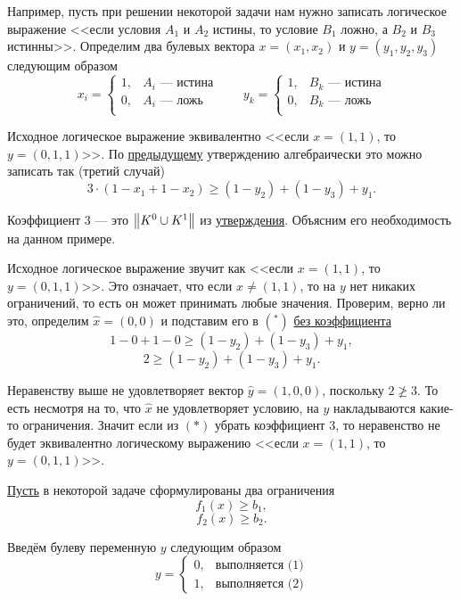 Например, пусть при решении некоторой задачи нам нужно записать логическое выражение <<если условия $A_1$ и $A_2$ истины, то условие $B_1$ ложно, а $B_2$ и $B_3$ истинны>>. Определим два булевых вектора $x = (x_1, x_2)$ и $y = (y_1, y_2, y_3)$ следующим образом
\[
x_i = \begin{cases}
	1,& \text{$A_i$ --- истина}\\
	0,& \text{$A_i$ --- ложь}\\
\end{cases} \qquad y_k = \begin{cases}
1,& \text{$B_k$ --- истина}\\
0,& \text{$B_k$ --- ложь}\\
\end{cases}
\]

Исходное логическое выражение эквивалентно <<если $x = (1, 1)$, то $y = (0, 1, 1)$>>. По \hyperref[fact:complex_conditions]{предыдущему} утверждению алгебраически это можно записать так (третий случай)
\[
\boxed{3 \cdot (1 - x_1 + 1 - x_2) \ge (1 - y_2) + (1 - y_3) + y_1}\tag{*}.
\]

Коэффициент $3$ --- это $\norm{K^0 \cup K^1}$ из \hyperref[fact:complex_conditions]{утверждения}. Объясним его необходимость на данном примере.

Исходное логическое выражение звучит как <<если $x = (1, 1)$, то $y = (0, 1, 1)$>>. Это означает, что если $x \neq (1, 1)$, то на $y$ нет никаких ограничений, то есть он может принимать любые значения. Проверим, верно ли это, определим $\hat{x} = (0, 0)$ и подставим его в $(^*)$ \underline{без коэффициента}
\[
1 - 0 + 1 - 0 \ge (1 - y_2) + (1 - y_3) + y_1,
\]
\[
2 \ge (1 - y_2) + (1 - y_3) + y_1.
\]

Неравенству выше не удовлетворяет вектор $\hat{y} = (1, 0, 0)$, поскольку $2 \ngeq 3$. То есть несмотря на то, что $\hat{x}$ не удовлетворяет условию, на $y$ накладываются какие-то ограничения. Значит если из $(*)$ убрать коэффициент $3$, то неравенство не будет эквивалентно логическому выражению <<если $x = (1, 1)$, то $y = (0, 1, 1)$>>.

\label{fact:alternative_conditions}

\underline{Пусть} в некоторой задаче сформулированы два ограничения
\[f_1(x) \ge b_1, \tag{1}\]
\[f_2(x) \ge b_2. \tag{2}\]

Введём булеву переменную $y$ следующим образом
\[
y = \begin{cases}
	0,& \text{выполняется (1)}\\
	1,&\text{выполняется (2)}
\end{cases}
\]

